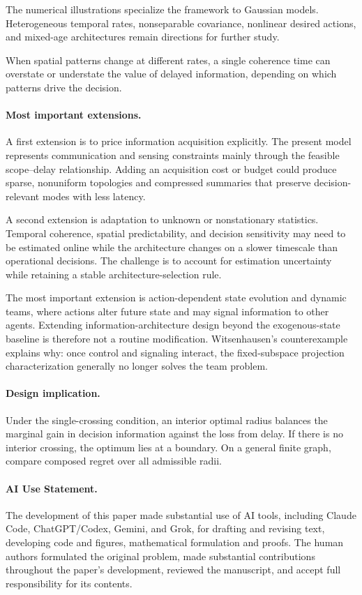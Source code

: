 \documentclass[11pt]{article}
\begin{document}
The numerical illustrations specialize the framework to Gaussian models.
Heterogeneous temporal rates, nonseparable covariance, nonlinear desired
actions, and mixed-age architectures remain directions for further study.

When spatial patterns change at different rates, a single coherence time can
overstate or understate the value of delayed information, depending on which
patterns drive the decision.

\paragraph{Most important extensions.}
A first extension is to price information acquisition explicitly. The present
model represents communication and sensing constraints mainly through the
feasible scope--delay relationship. Adding an acquisition cost or budget could
produce sparse, nonuniform topologies and compressed summaries that preserve
decision-relevant modes with less latency.

A second extension is adaptation to unknown or nonstationary statistics.
Temporal coherence, spatial predictability, and decision sensitivity may need
to be estimated online while the architecture changes on a slower timescale
than operational decisions. The challenge is to account for estimation
uncertainty while retaining a stable architecture-selection rule.

The most important extension is action-dependent state evolution and dynamic
teams, where actions alter future state and may signal information to other
agents. Extending information-architecture design beyond the exogenous-state
baseline is therefore not a routine modification.
Witsenhausen's counterexample \cite{witsenhausen1968counterexample} explains
why: once control and signaling interact, the fixed-subspace projection
characterization generally no longer solves the team problem.

\paragraph{Design implication.}
Under the single-crossing condition, an interior optimal radius balances
the marginal gain in decision information against the loss from delay.
If there is no interior crossing, the optimum lies at a boundary.
On a general finite graph,
compare composed regret over all admissible radii.

\paragraph{AI Use Statement.}
The development of this paper made substantial use of AI tools, including
Claude Code, ChatGPT/Codex, Gemini, and Grok, for drafting and revising text,
developing code and figures, mathematical formulation and proofs.
The human authors formulated the original problem, made substantial
contributions throughout the paper's development, reviewed the manuscript, and
accept full responsibility for its contents.
\end{document}
